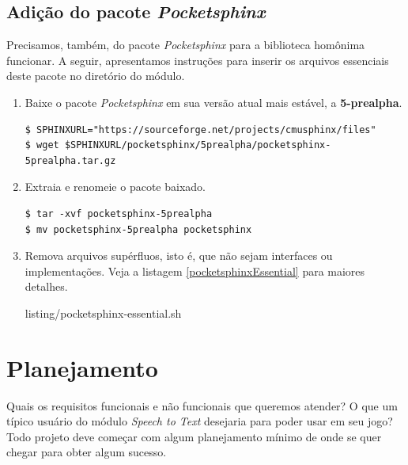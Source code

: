 \subsection{Adição do pacote \textit{Pocketsphinx}}

Precisamos, também, do pacote \textit{Pocketsphinx} para a biblioteca homônima funcionar. A seguir, apresentamos instruções para inserir os arquivos essenciais deste pacote no diretório do módulo.

\begin{enumerate}
\item Baixe o pacote \textit{Pocketsphinx} em sua versão atual mais estável, a \textbf{5-prealpha}.

\begin{lstlisting}
$ SPHINXURL="https://sourceforge.net/projects/cmusphinx/files"
$ wget $SPHINXURL/pocketsphinx/5prealpha/pocketsphinx-5prealpha.tar.gz
\end{lstlisting}

\item Extraia e renomeie o pacote baixado.

\begin{lstlisting}
$ tar -xvf pocketsphinx-5prealpha
$ mv pocketsphinx-5prealpha pocketsphinx
\end{lstlisting}

\item Remova arquivos supérfluos, isto é, que não sejam interfaces ou implementações. Veja a listagem \ref{pocketsphinxEssential} para maiores detalhes.


  {listing/pocketsphinx-essential.sh}
\end{enumerate}


\section{Planejamento}

Quais os requisitos funcionais e não funcionais que queremos atender? O que um típico usuário do módulo \textit{Speech to Text} desejaria para poder usar em seu jogo? Todo projeto deve começar com algum planejamento mínimo de onde se quer chegar para obter algum sucesso.


